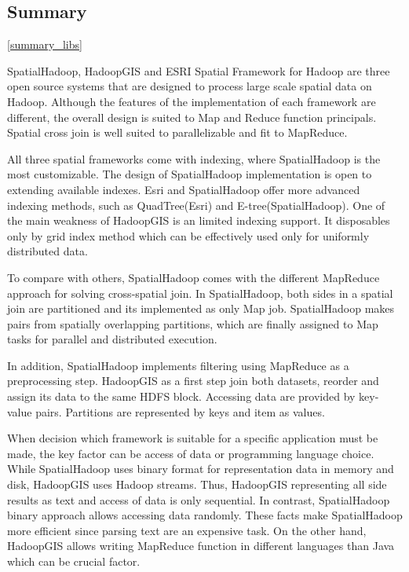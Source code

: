 \documentclass[a4paper,12pt,oneside]{report}
\begin{document}
		\subsection{Summary}\ref{summary_libs}
		
 SpatialHadoop, HadoopGIS and ESRI Spatial Framework for Hadoop are
three open source systems that are designed to process large scale
spatial data on Hadoop. Although the features of  the implementation of each framework are different, 
the overall design is suited to Map and Reduce function principals. Spatial cross join is well suited to parallelizable and fit to MapReduce. 

All three spatial frameworks come with indexing, where SpatialHadoop is the most customizable. 
The design of  SpatialHadoop implementation is open to extending available indexes. Esri and 
SpatialHadoop offer more advanced indexing methods, such as 
QuadTree(Esri) and E-tree(SpatialHadoop). One of the main weakness of HadoopGIS is an limited indexing 
support. It disposables only by grid index method which can be 
effectively used only for uniformly distributed data.

To compare with others, SpatialHadoop comes with the different MapReduce approach for solving cross-spatial join.
In SpatialHadoop, both sides in a spatial join are partitioned and its implemented as only 
Map job.  SpatialHadoop makes pairs from spatially overlapping partitions, which are finally 
assigned to Map tasks for parallel and distributed execution.

In addition, SpatialHadoop implements filtering using MapReduce as a preprocessing step.
HadoopGIS as a first step join both datasets, reorder and assign its data to the same 
HDFS block.  Accessing data are provided by key-value pairs. Partitions are represented by keys and item as values. 

When decision which framework is suitable for a specific application must be made, the 
key factor can be access of data  or programming language choice. While SpatialHadoop 
uses binary format for representation data in memory and disk, HadoopGIS 
uses Hadoop streams. Thus, HadoopGIS representing all side results as text and access 
of data is only sequential. In contrast, SpatialHadoop binary approach allows 
accessing data randomly.
These facts make SpatialHadoop more efficient since parsing text are an expensive task. 
On the other hand, HadoopGIS allows writing MapReduce function in different languages than Java which can be crucial factor. 
\end{document}
